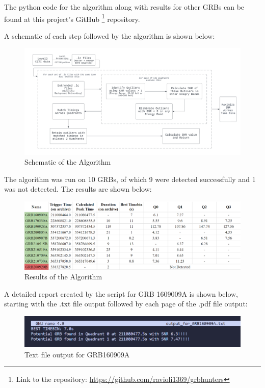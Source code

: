 \documentclass[11pt]{book} %
\begin{document}
The python code for the algorithm along with results for other GRBs can be found at this project's GitHub \footnote[1]{Link to the repository: \href{https://github.com/ravioli1369/grbhunters}{https://github.com/ravioli1369/grbhunters}} repository. 

\newpage
A schematic of each step followed by the algorithm is shown below:

\begin{figure}[H]
    \centering
    \includegraphics[width=\textwidth]{Pictures/algo.png}
    \caption{Schematic of the Algorithm}
\end{figure}

The algorithm was run on 10 GRBs, of which 9 were detected successfully and 1 was not detected. The results are shown below:

\begin{figure}[H]
    \centering
    \includegraphics[width=\textwidth]{Pictures/results.png}
    \caption{Results of the Algorithm}
\end{figure}

A detailed report created by the script for GRB 1609009A is shown below, starting with the .txt file output followed by each page of the .pdf file output:

\begin{figure}[H]
    \centering
    \includegraphics[width=\textwidth]{Pictures/txt.png}
    \caption{Text file output for GRB160909A}
\end{figure}
\end{document}

